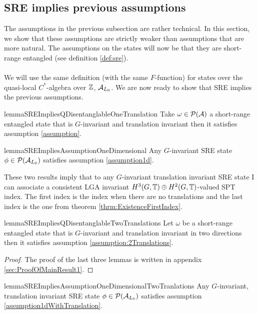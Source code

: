 \documentclass[11pt,a4paper,twoside]{article}
\numberwithin{equation}{section}
\begin{document}
	\subsection{SRE implies previous assumptions}\label{sec:Results_1}
	The assumptions in the previous subsection are rather technical. In this section, we show that these assumptions are strictly weaker than assumptions that are more natural. The assumptions on the states will now be that they are short-range entangled (see definition \ref{def:sre}).\\\\
	We will use the same definition (with the same $F$-function) for states over the quasi-local $C^*$-algebra over $\ZZ$, $\AA_{L_0}$. We are now ready to show that SRE implies the previous assumptions.
	\begin{restatable}{lemma}{SREImpliesQDisentanglableOneTranslation}\label{lem:SRE_Implies_QDisentanglable_OneTranslation}
		Take $\omega\in\PP(\AA)$ a short-range entangled state that is $G$-invariant and translation invariant then it satisfies assumption \ref{assumption}.
	\end{restatable}
	\begin{restatable}{lemma}{SREImpliesAssumptionOneDimensional}\label{lem:SRE_Implies_Assumption_1d}
		Any $G$-invariant SRE state $\phi\in\PP(\AA_{L_0})$ satisfies assumption \ref{assumption1d}.
	\end{restatable}
	These two results imply that to any $G$-invariant translation invariant SRE state I can associate a consistent LGA invariant $H^3(G,\TT)\oplus H^2(G,\TT)$-valued SPT index. The first index is the index when there are no translations and the last index is the one from theorem \ref{thrm:ExistenceFirstIndex}.
	\begin{restatable}{lemma}{SREImpliesQDisentanglableTwoTranslations}\label{lem:SRE_Implies_QDisentanglable_TwoTranslations}
		Let $\omega$ be a short-range entangled state that is $G$-invariant and translation invariant in two directions then it satisfies assumption \ref{assumption:2Translations}.
	\end{restatable}
	\begin{proof}
		The proof of the last three lemmas is written in appendix \ref{sec:ProofOfMainResult1}.
	\end{proof}
	\begin{restatable}{lemma}{SREImpliesAssumptionOneDimensionalTwoTranlations}\label{lem:SRE_Implies_Assumption_1dTwoTranslations}
		Any $G$-invariant, translation invariant SRE state $\phi\in\PP(\AA_{L_0})$ satisfies assumption \ref{assumption1dWithTranslation}.
	\end{restatable}
\end{document}
